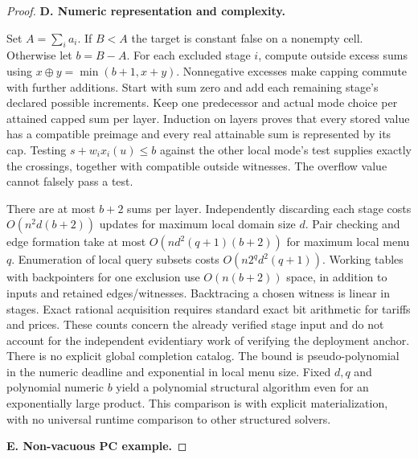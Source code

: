 \begin{proof}
\textbf{D. Numeric representation and complexity.}

Set \(A=\sum_i a_i\). If \(B<A\) the target is constant false on a nonempty cell. Otherwise let \(b=B-A\). For each excluded stage \(i\), compute outside excess sums using \(x\oplus y=\min(b+1,x+y)\). Nonnegative excesses make capping commute with further additions. Start with sum zero and add each remaining stage's declared possible increments. Keep one predecessor and actual mode choice per attained capped sum per layer. Induction on layers proves that every stored value has a compatible preimage and every real attainable sum is represented by its cap. Testing \(s+w_i x_i(u)\le b\) against the other local mode's test supplies exactly the crossings, together with compatible outside witnesses. The overflow value cannot falsely pass a test.

There are at most \(b+2\) sums per layer. Independently discarding each stage costs \(O(n^2d(b+2))\) updates for maximum local domain size \(d\). Pair checking and edge formation take at most \(O(nd^2(q+1)(b+2))\) for maximum local menu \(q\). Enumeration of local query subsets costs \(O(n2^q d^2(q+1))\). Working tables with backpointers for one exclusion use \(O(n(b+2))\) space, in addition to inputs and retained edges/witnesses. Backtracing a chosen witness is linear in stages. Exact rational acquisition requires standard exact bit arithmetic for tariffs and prices. These counts concern the already verified stage input and do not account for the independent evidentiary work of verifying the deployment anchor. There is no explicit global completion catalog. The bound is pseudo-polynomial in the numeric deadline and exponential in local menu size. Fixed \(d,q\) and polynomial numeric \(b\) yield a polynomial structural algorithm even for an exponentially large product. This comparison is with explicit materialization, with no universal runtime comparison to other structured solvers.

\textbf{E. Non-vacuous PC example.}


\end{proof}
